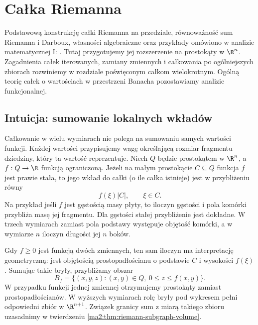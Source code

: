 \chapter{Całka Riemanna}
\label{ma2:ch:riemann-integral}

Podstawową konstrukcję całki Riemanna na przedziale,
równoważność sum Riemanna i Darboux, własności
algebraiczne oraz przykłady omówiono w analizie
matematycznej I:
.
Tutaj przygotujemy jej rozszerzenie na prostokąty
w $\R^n$. Zagadnienia całek iterowanych, zamiany
zmiennych i całkowania po ogólniejszych zbiorach
rozwiniemy w rozdziale poświęconym całkom wielokrotnym.
Ogólną teorię całek o wartościach w przestrzeni Banacha
pozostawiamy analizie funkcjonalnej.

\section{Intuicja: sumowanie lokalnych wkładów}

Całkowanie w wielu wymiarach nie polega na
sumowaniu samych wartości funkcji. Każdej
wartości przypisujemy wagę określającą rozmiar
fragmentu dziedziny, który ta wartość reprezentuje.
Niech $Q$ będzie prostokątem w $\R^n$, a $f:Q\to\R$
funkcją ograniczoną. Jeżeli na małym prostokącie
$C\subseteq Q$ funkcja $f$
jest prawie stała, to jego wkład do całki
(o ile całka istnieje) jest w przybliżeniu równy
\[
 f(\xi)|C|,\qquad \xi\in C.
\]
Na przykład jeśli $f$ jest gęstością masy
płyty, to iloczyn gęstości i pola komórki
przybliża masę jej fragmentu. Dla gęstości
stałej przybliżenie jest dokładne.
W trzech wymiarach zamiast pola podstawy
występuje objętość komórki, a w wymiarze $n$
iloczyn długości jej $n$ boków.

Gdy $f\ge0$ jest funkcją dwóch zmiennych,
ten sam iloczyn ma interpretację geometryczną:
jest objętością prostopadłościanu o podstawie
$C$ i wysokości $f(\xi)$.
Sumując takie bryły, przybliżamy obszar
\[
 B_f=\{(x,y,z):(x,y)\in Q,\ 0\le z\le f(x,y)\}.
\]
W przypadku funkcji jednej zmiennej
otrzymujemy prostokąty zamiast prostopadłościanów.
W wyższych wymiarach rolę bryły pod wykresem
pełni odpowiedni zbiór w $\R^{n+1}$.
Związek granicy sum z miarą takiego zbioru
uzasadnimy w twierdzeniu
\ref{ma2:thm:riemann-subgraph-volume}.

